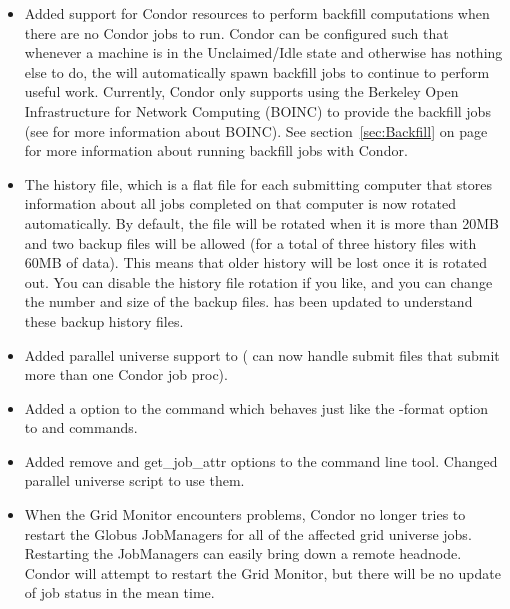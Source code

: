 \begin{itemize}

\item Added support for Condor resources to perform backfill
  computations when there are no Condor jobs to run.
  Condor can be configured such that whenever a machine is in the
  Unclaimed/Idle state and otherwise has nothing else to do, the
   will automatically spawn backfill jobs to continue
  to perform useful work.
  Currently, Condor only supports using the Berkeley Open
  Infrastructure for Network Computing (BOINC) to provide the backfill
  jobs (see  for more information about
  BOINC).
  See section~\ref{sec:Backfill} on page~\pageref{sec:Backfill} for
  more information about running backfill jobs with Condor.

\item The history file, which is a flat file for each submitting
computer that stores information about all jobs completed on that
computer is now rotated automatically. By default, the file will be
rotated when it is more than 20MB and two backup files will be allowed
(for a total of three history files with 60MB of data). This means
that older history will be lost once it is rotated out. You can
disable the history file rotation if you like, and you can change the
number and size of the backup files.  has been updated
to understand these backup history files. 

\item Added parallel universe support to  (
can now handle submit files that submit more than one Condor job proc).

\item Added a  option to the  command which
behaves just like the -format option to  and 
commands.

\item Added remove and get\_job\_attr options to the 
command line tool.  Changed parallel universe script to use them.

\item When the Grid Monitor encounters problems, Condor no longer tries
to restart the Globus JobManagers for all of the affected grid universe
jobs. Restarting the JobManagers can easily bring down a remote headnode.
Condor will attempt to restart the Grid Monitor, but there will be
no update of job status in the mean time. 


\end{itemize}
